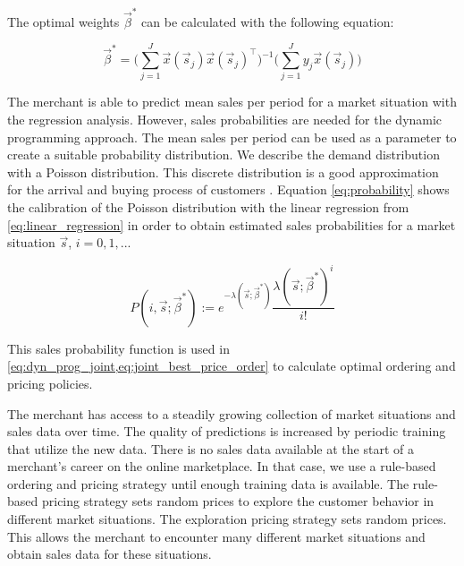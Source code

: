 The optimal weights $\vec{\beta}^*$ can be calculated with the following equation:

\begin{equation}
\vec{\beta}^* = \bigg(\sum_{j=1}^J{\vec{x}(\vec{s}_j) \vec{x}(\vec{s}_j)^\intercal} \bigg)^{-1}
			  \bigg(\sum_{j=1}^J{y_j \vec{x}(\vec{s}_j)} \bigg)
\label{eq:least_squares_solution}
\end{equation}

The merchant is able to predict mean sales per period for a market situation with the regression analysis.
However, sales probabilities are needed for the dynamic programming approach.
The mean sales per period can be used as a parameter to create a suitable probability distribution.
We describe the demand distribution with a Poisson distribution.
This discrete distribution is a good approximation for the arrival and buying process of customers \cite{DBLP:journals/ior/Wolff82}.
Equation \cref{eq:probability} shows the calibration of the Poisson distribution with the linear regression from \cref{eq:linear_regression} in order to obtain estimated sales probabilities for a market situation $\vec{s}$, $i = 0,1,...$

\begin{equation}
\label{eq:probability}
P(i, \vec{s}; \vec{\beta}^*) :=
	e^{-\lambda(\vec{s}; \vec{\beta}^*)}
	\frac{\lambda(\vec{s}; \vec{\beta}^*)^{i}}{i!}
\end{equation}

This sales probability function is used in \cref{eq:dyn_prog_joint,eq:joint_best_price_order} to calculate optimal ordering and pricing policies.


The merchant has access to a steadily growing collection of market situations and sales data over time.
The quality of predictions is increased by periodic training that utilize the new data.
There is no sales data available at the start of a merchant's career on the online marketplace.
In that case, we use a rule-based ordering and pricing strategy until enough training data is available.
The rule-based pricing strategy sets random prices to explore the customer behavior in different market situations.
The exploration pricing strategy sets random prices.
This allows the merchant to encounter many different market situations and obtain sales data for these situations.

